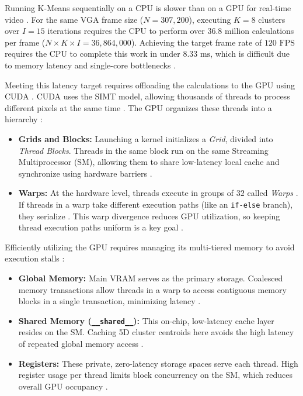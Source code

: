 Running K-Means sequentially on a CPU is slower than on a GPU for real-time video \cite{farivar2008parallel}. For the same VGA frame size ($N = 307,200$), executing $K=8$ clusters over $I=15$ iterations requires the CPU to perform over $36.8$ million calculations per frame ($N \times K \times I = 36,864,000$). Achieving the target frame rate of $120\text{ FPS}$ requires the CPU to complete this work in under $8.33\text{ ms}$, which is difficult due to memory latency and single-core bottlenecks \cite{cook2012cuda}.

Meeting this latency target requires offloading the calculations to the GPU using CUDA \cite{CudaGuide}. CUDA uses the SIMT model, allowing thousands of threads to process different pixels at the same time \cite{cook2012cuda}. The GPU organizes these threads into a hierarchy \cite{CudaGuide}:
\begin{itemize}
    \item \textbf{Grids and Blocks:} Launching a kernel initializes a \textit{Grid}, divided into \textit{Thread Blocks}. Threads in the same block run on the same Streaming Multiprocessor (SM), allowing them to share low-latency local cache and synchronize using hardware barriers \cite{CudaGuide,cook2012cuda}.
    \item \textbf{Warps:} At the hardware level, threads execute in groups of $32$ called \textit{Warps} \cite{cook2012cuda}. If threads in a warp take different execution paths (like an \texttt{if-else} branch), they serialize \cite{cook2012cuda}. This warp divergence reduces GPU utilization, so keeping thread execution paths uniform is a key goal \cite{cook2012cuda}.
\end{itemize}

Efficiently utilizing the GPU requires managing its multi-tiered memory to avoid execution stalls \cite{cook2012cuda}:
\begin{itemize}
    \item \textbf{Global Memory:} Main VRAM serves as the primary storage. Coalesced memory transactions allow threads in a warp to access contiguous memory blocks in a single transaction, minimizing latency \cite{CudaGuide, cook2012cuda}.
    \item \textbf{Shared Memory (\texttt{\_\_shared\_\_}):} This on-chip, low-latency cache layer resides on the SM. Caching 5D cluster centroids here avoids the high latency of repeated global memory access \cite{CudaGuide, farivar2008parallel}.
    \item \textbf{Registers:} These private, zero-latency storage spaces serve each thread. High register usage per thread limits block concurrency on the SM, which reduces overall GPU occupancy \cite{CudaGuide, cook2012cuda}.
\end{itemize}

